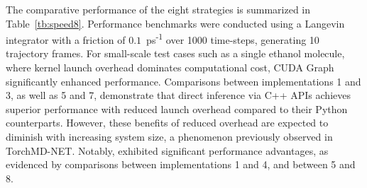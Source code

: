 \ifdefined\InlineFloatEnv

\else\fi

The comparative performance of the eight strategies is summarized
in Table~\ref{tb:speed8}.
Performance benchmarks were conducted
using a Langevin integrator with a friction
of $0.1$~ps\textsuperscript{-1} over 1000 time-steps,
generating 10 trajectory frames.
For small-scale test cases such as a single ethanol molecule,
where kernel launch overhead dominates computational cost,
CUDA Graph significantly enhanced performance.
Comparisons between implementations 1 and 3, as well as 5 and 7,
demonstrate that direct inference via C++ APIs achieves superior performance
with reduced launch overhead compared to their Python counterparts.
However, these benefits of reduced overhead are expected to diminish
with increasing system size, a phenomenon previously observed in TorchMD-NET.
Notably, \texttt{\torchcompile} exhibited significant performance advantages,
as evidenced by comparisons between implementations 1 and 4,
and between 5 and 8.

\ifdefined\InlineFloatEnv

\else\fi

